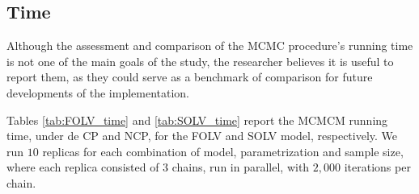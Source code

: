 
\subsection{Time}

Although the assessment and comparison of the MCMC procedure's running time is not one of the main goals of the study, the researcher believes it is useful to report them, as they could serve as a benchmark of comparison for future developments of the implementation.

Tables \ref{tab:FOLV_time} and \ref{tab:SOLV_time} report the MCMCM running time, under de CP and NCP, for the FOLV and SOLV model, respectively. We run $10$ replicas for each combination of model, parametrization and sample size, where each replica consisted of $3$ chains, run in parallel, with $2,000$ iterations per chain.

